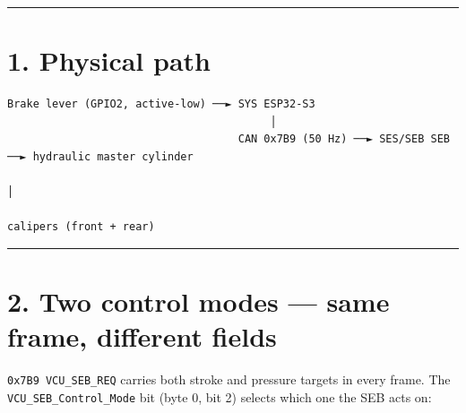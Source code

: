 \documentclass[12pt,a4paper,oneside]{report}
\begin{document}
\begin{center}\rule{0.5\linewidth}{0.5pt}\end{center}

\section{1. Physical path}\label{physical-path}

\begin{verbatim}
Brake lever (GPIO2, active-low) ──► SYS ESP32-S3
                                         │
                                    CAN 0x7B9 (50 Hz) ──► SES/SEB SEB ──► hydraulic master cylinder
                                                                              │
                                                                         calipers (front + rear)
\end{verbatim}

\begin{center}\rule{0.5\linewidth}{0.5pt}\end{center}

\section{2. Two control modes --- same frame, different
fields}\label{two-control-modes-same-frame-different-fields}

\texttt{0x7B9\ VCU\_SEB\_REQ} carries both stroke and pressure targets in every
frame. The \texttt{VCU\_SEB\_Control\_Mode} bit (byte 0, bit 2) selects which
one the SEB acts on:
\end{document}
